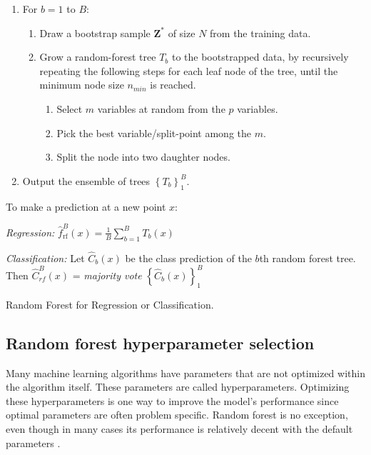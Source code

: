 \begin{algorithm}
    \footnotesize
    \begin{minipage}{.92\linewidth}
    \begin{enumerate}
        \item For $b = 1$ to $B$:
        \begin{enumerate}
            \item Draw a bootstrap sample $\bm{Z}^{*}$ of size $N$ from the training data.
            \item Grow a random-forest tree $T_b$ to the bootstrapped data, by recursively repeating the following steps for each leaf node of the tree, until the minimum node size $n_{min}$ is reached.
            \begin{enumerate}
                \item Select $m$ variables at random from the $p$ variables.
                \item Pick the best variable/split-point among the $m$.
                \item Split the node into two daughter nodes.
            \end{enumerate}
        \end{enumerate}
        \item Output the ensemble of trees $\left\{ T _ { b } \right\} _ { 1 } ^ { B }$.
    \end{enumerate}
    To make a prediction at a new point $x$:

    \textit{Regression:} $\hat { f } _ { \mathrm { rf } } ^ { B } ( x ) = \frac { 1 } { B } \sum _ { b = 1 } ^ { B } T _ { b } ( x )$

    \textit{Classification:} Let $\hat { C } _ { b } ( x )$ be the class prediction of the $b$th random forest
    tree. Then $\hat{C} _ { r f } ^ { B } ( x )$ = \textit{majority vote} $\left\{ \hat { C } _ { b } ( x ) \right\} _ { 1 } ^ { B }$
    \end{minipage}
    \caption{\footnotesize Random Forest for Regression or Classification.}
    \label{alg:random_forest}
\end{algorithm}

\subsection{Random forest hyperparameter selection}
Many machine learning algorithms have parameters that are not optimized within the algorithm itself. These parameters are called hyperparameters. Optimizing these hyperparameters is one way to improve the model's performance since optimal parameters are often problem specific. Random forest is no exception, even though in many cases its performance is relatively decent with the default parameters \cite{probst2018hyperparameters}.

